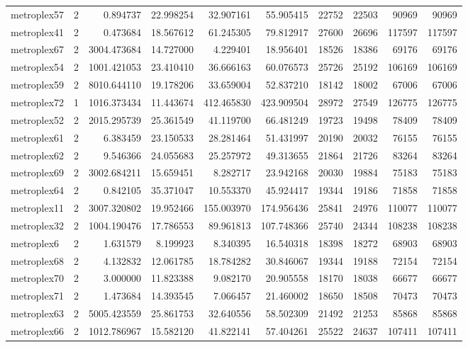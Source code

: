 \begin{longtable}{|l|r|r|r|r|r|r|r|r|r|}
metroplex57 & 2 & 0.894737 & 22.998254 & 32.907161 & 55.905415 & 22752 & 22503 & 90969 & 90969 \\
metroplex41 & 2 & 0.473684 & 18.567612 & 61.245305 & 79.812917 & 27600 & 26696 & 117597 & 117597 \\
metroplex67 & 2 & 3004.473684 & 14.727000 & 4.229401 & 18.956401 & 18526 & 18386 & 69176 & 69176 \\
metroplex54 & 2 & 1001.421053 & 23.410410 & 36.666163 & 60.076573 & 25726 & 25192 & 106169 & 106169 \\
metroplex59 & 2 & 8010.644110 & 19.178206 & 33.659004 & 52.837210 & 18142 & 18002 & 67006 & 67006 \\
metroplex72 & 1 & 1016.373434 & 11.443674 & 412.465830 & 423.909504 & 28972 & 27549 & 126775 & 126775 \\
metroplex52 & 2 & 2015.295739 & 25.361549 & 41.119700 & 66.481249 & 19723 & 19498 & 78409 & 78409 \\
metroplex61 & 2 & 6.383459 & 23.150533 & 28.281464 & 51.431997 & 20190 & 20032 & 76155 & 76155 \\
metroplex62 & 2 & 9.546366 & 24.055683 & 25.257972 & 49.313655 & 21864 & 21726 & 83264 & 83264 \\
metroplex69 & 2 & 3002.684211 & 15.659451 & 8.282717 & 23.942168 & 20030 & 19884 & 75183 & 75183 \\
metroplex64 & 2 & 0.842105 & 35.371047 & 10.553370 & 45.924417 & 19344 & 19186 & 71858 & 71858 \\
metroplex11 & 2 & 3007.320802 & 19.952466 & 155.003970 & 174.956436 & 25841 & 24976 & 110077 & 110077 \\
metroplex32 & 2 & 1004.190476 & 17.786553 & 89.961813 & 107.748366 & 25740 & 24344 & 108238 & 108238 \\
metroplex6 & 2 & 1.631579 & 8.199923 & 8.340395 & 16.540318 & 18398 & 18272 & 68903 & 68903 \\
metroplex68 & 2 & 4.132832 & 12.061785 & 18.784282 & 30.846067 & 19344 & 19188 & 72154 & 72154 \\
metroplex70 & 2 & 3.000000 & 11.823388 & 9.082170 & 20.905558 & 18170 & 18038 & 66677 & 66677 \\
metroplex71 & 2 & 1.473684 & 14.393545 & 7.066457 & 21.460002 & 18650 & 18508 & 70473 & 70473 \\
metroplex63 & 2 & 5005.423559 & 25.861753 & 32.640556 & 58.502309 & 21492 & 21253 & 85868 & 85868 \\
metroplex66 & 2 & 1012.786967 & 15.582120 & 41.822141 & 57.404261 & 25522 & 24637 & 107411 & 107411 \\

\end{longtable}
